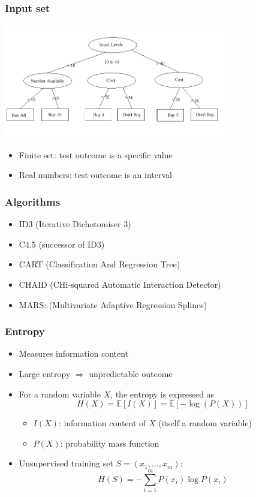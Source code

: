 \documentclass[10pt]{beamer}
\begin{document}
\begin{frame}
  \frametitle{Input set}
  \begin{center}
  \includegraphics[height=5cm]{images/dtree.png}
  \end{center}
  \begin{itemize}
    \item {\color{red} Finite set}: test outcome is a specific value
	\item {\color{green} Real numbers}: test outcome is an interval
  \end{itemize}
\end{frame}

\begin{frame}
  \frametitle{Algorithms}
  \begin{itemize}
    \item ID3 (Iterative Dichotomiser 3)
    \item {\color{red} C4.5} (successor of ID3)
    \item CART (Classification And Regression Tree)
    \item CHAID (CHi-squared Automatic Interaction Detector)
    \item MARS: (Multivariate Adaptive Regression Splines)
  \end{itemize}
\end{frame}

\begin{frame}
  \frametitle{Entropy}
  \begin{itemize}
    \item Measures {\color{red} information content}
    \item Large entropy $\Rightarrow$ unpredictable outcome
	\item For a random variable $X$, the entropy is expressed as
	\[H(X)=\mathbb{E}[I(X)]=\mathbb{E}[-\log(P(X))]\]
  \begin{itemize}
	\item $I(X)$: information content of $X$ (itself a random variable)
	\item $P(X)$: probability mass function
  \end{itemize}
	\item {\color{red} Unsupervised} training set $S=(x_1,\ldots,x_m)$: \[H(S)=-\sum_{i=1}^mP(x_i)\log P(x_i)\]
  \end{itemize}
\end{frame}
\end{document}
